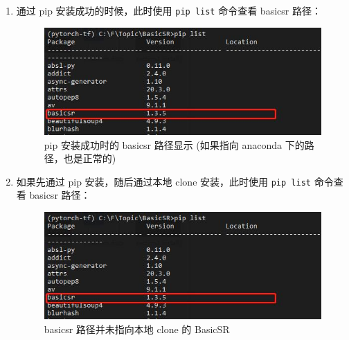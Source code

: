 \documentclass[../main.tex]{subfiles}
\begin{document}
\begin{enumerate}
\begin{enumerate}
              \item 通过 pip 安装成功的时候，此时使用 \texttt{pip list} 命令查看 basicsr 路径：
                    \begin{figure}[H]
                        \begin{center}
                            \includegraphics[width=0.7\linewidth]{figures/installation_pip_install_location.jpg}
                            \caption{pip 安装成功时的 basicsr 路径显示 (如果指向 anaconda 下的路径，也是正常的)}
                            \label{fig:correct-pip-install}
                        \end{center}
                        \vspace{-0.5cm}
                    \end{figure}

              \item 如果先通过 pip 安装，随后通过本地 clone 安装，此时使用 \texttt{pip list} 命令查看 basicsr 路径：
                    \begin{figure}[H]
                        \begin{center}
                            \includegraphics[width=0.7\linewidth]{figures/installation_pip_install_location.jpg}
                            \caption{basicsr 路径并未指向本地 clone 的 BasicSR}
                            \label{fig:false-clone-install}
                        \end{center}
                        \vspace{-0.5cm}
                    \end{figure}


\end{enumerate}
\end{enumerate}
\end{document}

